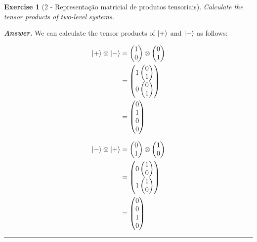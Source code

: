 \documentclass[12pt]{article}
\newtheorem{exercise}{Exercise}
\newenvironment{answer}{\noindent\textbf{\textit{Answer.}} \normalfont }{\par\noindent\rule{\textwidth}{0.4pt}}
\begin{document}
	\begin{exercise}[2 - Representação matricial de produtos tensoriais]
		Calculate the tensor products of two-level systems.
	\end{exercise}
	\begin{answer}
		We can calculate the tensor products of $\ket{+}$ and $\ket{-}$ as follows:
		
		\begin{align*}
			\ket{+} \otimes \ket{-} &= \begin{pmatrix} 1 \\ 0 \end{pmatrix} \otimes \begin{pmatrix} 0 \\ 1 \end{pmatrix} \\
			&= \begin{pmatrix} 1\begin{pmatrix} 0 \\ 1 \end{pmatrix} \\ 0\begin{pmatrix} 0 \\ 1 \end{pmatrix} \end{pmatrix} \\
			&= \begin{pmatrix} 0 \\ 1 \\ 0 \\ 0 \end{pmatrix} 
		\end{align*}
		
		\begin{align*}
			\ket{-} \otimes \ket{+} &= \begin{pmatrix} 0 \\ 1 \end{pmatrix} \otimes \begin{pmatrix} 1 \\ 0 \end{pmatrix} \\
			&= \begin{pmatrix} 0\begin{pmatrix} 1 \\ 0 \end{pmatrix} \\ 1\begin{pmatrix} 1 \\ 0 \end{pmatrix} \end{pmatrix} \\
			&= \begin{pmatrix} 0 \\ 0 \\ 1 \\ 0 \end{pmatrix}
		\end{align*}
		

\end{answer}
\end{document}
